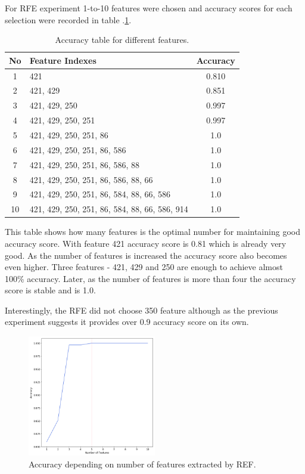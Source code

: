 \documentclass[11pt]{article}
\begin{document}
			For RFE experiment 1-to-10 features were chosen and accuracy scores for each selection were recorded in table .\ref{tbl:accuracy_table}.

		\begin{center}
		  	\begin{table}[h]
		  	\centering
			\begin{tabular}[b]{|c | l | c|}
				 \hline
				 No & Feature Indexes 	  						    & Accuracy \\ 
				 \hline
				 1 & 421 											& 0.810 \\ 
				 2 & 421, 429 										& 0.851 \\ 
				 3 & 421, 429, 250 									& 0.997 \\ 
				 4 & 421, 429, 250, 251 							& 0.997 \\ 
				 5 & 421, 429, 250, 251, 86 						& 1.0 	\\ 
				 6 & 421, 429, 250, 251, 86, 586 					& 1.0 	\\ 
				 7 & 421, 429, 250, 251, 86, 586, 88 				& 1.0 	\\ 
				 8 & 421, 429, 250, 251, 86, 586, 88, 66 			& 1.0 	\\ 
				 9 & 421, 429, 250, 251, 86, 584, 88, 66, 586 		& 1.0 	\\ 
				 10 & 421, 429, 250, 251, 86, 584, 88, 66, 586, 914 & 1.0 	\\ 
				 \hline
			\end{tabular}
			\caption{Accuracy table for different features. }
			\label{tbl:accuracy_table}
			\end{table}
		\end{center}

		This table shows how many features is the optimal number for maintaining good accuracy score. With feature 421 accuracy score is 0.81 which is already very good. As the number of features is increased the accuracy score also becomes even higher. Three features - 421, 429 and 250 are enough to achieve almost 100\% accuracy. Later, as the number of features is more than four the accuracy score is stable and is 1.0.

		Interestingly, the RFE did not choose 350 feature although as the previous experiment suggests it provides over 0.9 accuracy score on its own. 

		\begin{figure}[h]
			\centering
			\includegraphics[width=0.5\textwidth]{png/ref_multi}
			\caption{Accuracy depending on number of features extracted by REF.}
			\label{fig:ref_multi}
		\end{figure}
\end{document}
